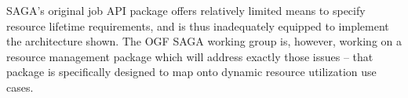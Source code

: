 \documentclass[10pt,conference,final,letterpaper,twoside,twocolumn,]{IEEEtran}
\newcommand{\B}[1]{\textbf{#1}}
\begin{document}
 SAGA's original job API package offers relatively limited means to
 specify resource lifetime requirements, and is thus inadequately
 equipped to implement the architecture shown.  The OGF SAGA working
 group is, however, working on a resource management package which
 will address exactly those issues -- that package is specifically
 designed to map onto dynamic resource utilization use cases.


\end{document}
